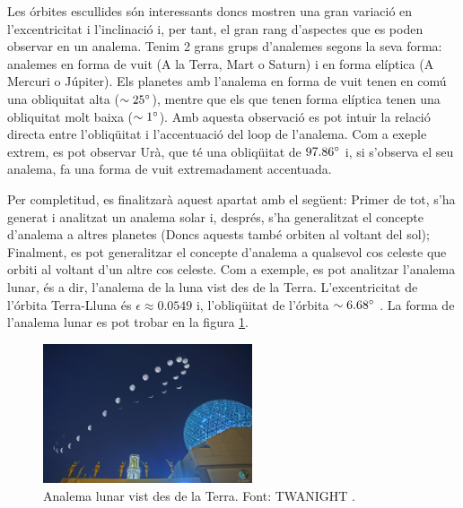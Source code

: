 \documentclass[a4paper, 11pt]{article}
\begin{document}
\noindent Les órbites escullides són interessants doncs mostren una gran variació en l'excentricitat i l'inclinació i, per tant, el gran rang d'aspectes que es poden observar en un analema. Tenim 2 grans grups d'analemes segons la seva forma: analemes en forma de vuit (A la Terra, Mart o Saturn) i en forma elíptica (A Mercuri o Júpiter). Els planetes amb l'analema en forma de vuit tenen en comú una obliquitat alta ($\sim 25\degree$), mentre que els que tenen forma elíptica tenen una obliquitat molt baixa ($\sim 1\degree$). Amb aquesta observació es pot intuir la relació directa entre l'obliqüitat i l'accentuació del loop de l'analema. Com a exeple extrem, es pot observar Urà, que té una obliqüitat de $97.86 \degree$ i, si s'observa el seu analema, fa una forma de vuit extremadament accentuada. 

\vspace{2mm}

\noindent Per completitud, es finalitzarà aquest apartat amb el següent: Primer de tot, s'ha generat i analitzat un analema solar i, després, s'ha generalitzat el concepte d'analema a altres planetes (Doncs aquests també orbiten al voltant del sol); Finalment, es pot generalitzar el concepte d'analema a qualsevol cos celeste que orbiti al voltant d'un altre cos celeste. Com a exemple, es pot analitzar l'analema lunar, és a dir, l'analema de la luna vist des de la Terra. L'excentricitat de l'órbita Terra-Lluna és $\epsilon \approx 0.0549$ i, l'obliqüitat de l'órbita $\sim 6.68 \degree$ \cite{LLUNA}. La forma de l'analema lunar es pot trobar en la figura \ref{fig:analema_luna}.

\begin{figure}[h!]
    \centering
    \includegraphics[width=0.55\textwidth]{images/analema_luna.jpg}
    \caption{Analema lunar vist des de la Terra. Font: TWANIGHT \cite{ANALEMA_MOON}.}
    \label{fig:analema_luna}
\end{figure}

\vspace{2mm}
\end{document}
